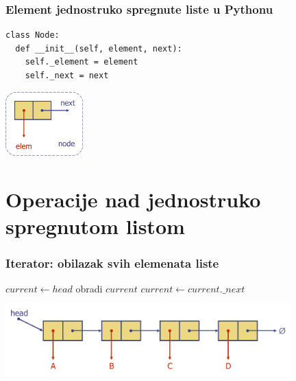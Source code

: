 \documentclass[compress]{beamer}
\begin{document}
\begin{frame}[fragile]
  \frametitle{Element jednostruko spregnute liste u Pythonu}
\begin{verbatim}
class Node:
  def __init__(self, element, next):
    self._element = element
    self._next = next
\end{verbatim}
  \begin{center}
    \includegraphics[width=3cm]{asp-07-pic01.png}
  \end{center}
\end{frame}

\section[Operacije]{Operacije nad jednostruko spregnutom listom}
\begin{frame}[fragile]
  \frametitle{Iterator: obilazak svih elemenata liste}
\begin{algorithmic}
\STATE $current \leftarrow head$
  \STATE obradi $current$
  \STATE $current \leftarrow current.\_next$
\ENDWHILE
\end{algorithmic}
  \begin{center}
    \includegraphics[width=11cm]{asp-07-pic02.png}
  \end{center}
\end{frame}
\end{document}

